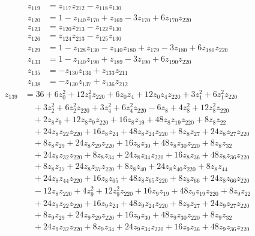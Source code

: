 \documentclass[11pt]{article}
\theoremstyle{remark}
\begin{document}
\begin{align*}
z_{119}&=z_{117} z_{212}-z_{118} z_{130}\\[3pt]
z_{120}&=1-z_{140} z_{170}+z_{169}-3z_{170}+6z_{170} z_{220}\\[3pt]
z_{123}&=z_{120} z_{213}-z_{122} z_{130}\\[3pt]
z_{126}&=z_{124} z_{213}-z_{125} z_{130}\\[3pt]
z_{129}&=1-z_{128} z_{130}-z_{140} z_{180}+z_{179}-3z_{180}+6z_{180} z_{220}\\[3pt]
z_{133}&=1-z_{140} z_{190}+z_{189}-3z_{190}+6z_{190} z_{220}\\[3pt]
z_{135}&=-z_{130} z_{134}+z_{133} z_{211}\\[3pt]
z_{138}&=-z_{130} z_{137}+z_{136} z_{212}
\end{align*}
\begin{align*}
z_{139}&=36+6z_{0}^{2}+12z_{0}^{2} z_{220}+6z_{0} z_{4}+12z_{0} z_{4} z_{220}+3z_{1}^{2}+6z_{1}^{2} z_{220}\\
&\quad{}+3z_{2}^{2}+6z_{2}^{2} z_{220}+3z_{4}^{2}+6z_{4}^{2} z_{220}-6z_{8}+4z_{8}^{2}+12z_{8}^{2} z_{220}\\
&\quad{}+2z_{8} z_{9}+12z_{8} z_{9} z_{220}+16z_{8} z_{19}+48z_{8} z_{19} z_{220}+8z_{8} z_{22}\\
&\quad{}+24z_{8} z_{22} z_{220}+16z_{8} z_{24}+48z_{8} z_{24} z_{220}+8z_{8} z_{27}+24z_{8} z_{27} z_{220}\\
&\quad{}+8z_{8} z_{29}+24z_{8} z_{29} z_{220}+16z_{8} z_{30}+48z_{8} z_{30} z_{220}+8z_{8} z_{32}\\
&\quad{}+24z_{8} z_{32} z_{220}+8z_{8} z_{34}+24z_{8} z_{34} z_{220}+16z_{8} z_{36}+48z_{8} z_{36} z_{220}\\
&\quad{}+8z_{8} z_{37}+24z_{8} z_{37} z_{220}+8z_{8} z_{40}+24z_{8} z_{40} z_{220}+8z_{8} z_{44}\\
&\quad{}+24z_{8} z_{44} z_{220}+16z_{8} z_{65}+48z_{8} z_{65} z_{220}+8z_{8} z_{66}+24z_{8} z_{66} z_{220}\\
&\quad{}-12z_{8} z_{220}+4z_{9}^{2}+12z_{9}^{2} z_{220}+16z_{9} z_{19}+48z_{9} z_{19} z_{220}+8z_{9} z_{22}\\
&\quad{}+24z_{9} z_{22} z_{220}+16z_{9} z_{24}+48z_{9} z_{24} z_{220}+8z_{9} z_{27}+24z_{9} z_{27} z_{220}\\
&\quad{}+8z_{9} z_{29}+24z_{9} z_{29} z_{220}+16z_{9} z_{30}+48z_{9} z_{30} z_{220}+8z_{9} z_{32}\\
&\quad{}+24z_{9} z_{32} z_{220}+8z_{9} z_{34}+24z_{9} z_{34} z_{220}+16z_{9} z_{36}+48z_{9} z_{36} z_{220}\\

\end{align*}
\end{document}

